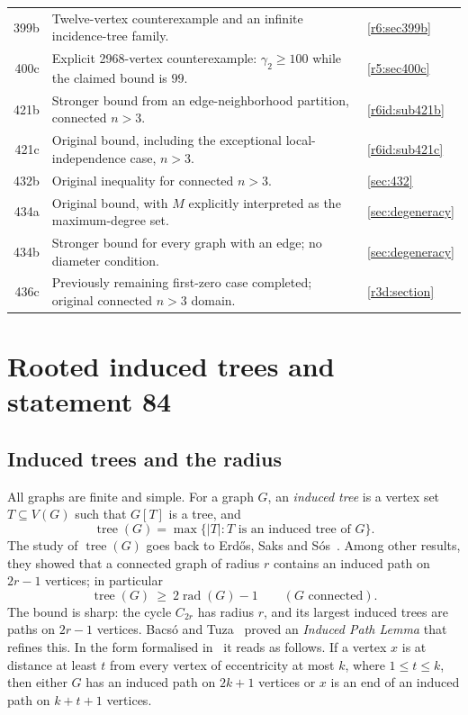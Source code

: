 \documentclass[11pt,a4paper]{article}
\theoremstyle{remark}
\newcommand{\rad}{\operatorname{rad}}
\newcommand{\tr}{\tree}
\newcommand{\tree}{\operatorname{tree}}
\begin{document}
\begin{longtable}{@{}r p{10.5cm} l@{}}
399b & Twelve-vertex counterexample and an infinite incidence-tree family. & \ref{r6:sec399b}\\
400c & Explicit 2968-vertex counterexample: $\gamma_2\ge100$ while the claimed bound is $99$. & \ref{r5:sec400c}\\
421b & Stronger bound from an edge-neighborhood partition, connected $n>3$. & \ref{r6id:sub421b}\\
421c & Original bound, including the exceptional local-independence case, $n>3$. & \ref{r6id:sub421c}\\
432b & Original inequality for connected $n>3$. & \ref{sec:432}\\
434a & Original bound, with $M$ explicitly interpreted as the maximum-degree set. & \ref{sec:degeneracy}\\
434b & Stronger bound for every graph with an edge; no diameter condition. & \ref{sec:degeneracy}\\
436c & Previously remaining first-zero case completed; original connected $n>3$ domain. & \ref{r3d:section}\\
\bottomrule
\end{longtable}
\section{Rooted induced trees and statement 84}\label{sec:84}
\subsection{Induced trees and the radius}

All graphs are finite and simple. For a graph $G$, an \emph{induced tree} is a vertex set $T\subseteq V(G)$ such that $G[T]$ is a tree, and
\[
\tr(G)=\max\{|T| : T \text{ is an induced tree of } G\}.
\]
The study of $\tr(G)$ goes back to Erd\H{o}s, Saks and S\'os~\cite{ESS86}. Among other results, they showed that a connected graph of radius $r$ contains an induced path on $2r-1$ vertices; in particular
\begin{equation}\label{eq:ESS}
\tr(G)\ \ge\ 2\rad(G)-1 \qquad (G \text{ connected}).
\end{equation}
The bound is sharp: the cycle $C_{2r}$ has radius $r$, and its largest induced trees are paths on $2r-1$ vertices. Bacs\'o and Tuza~\cite{BT90} proved an \emph{Induced Path Lemma} that refines this. In the form formalised in~\cite{Mak} it reads as follows. If a vertex $x$ is at distance at least $t$ from every vertex of eccentricity at most $k$, where $1\le t\le k$, then either $G$ has an induced path on $2k+1$ vertices or $x$ is an end of an induced path on $k+t+1$ vertices.
\end{document}
